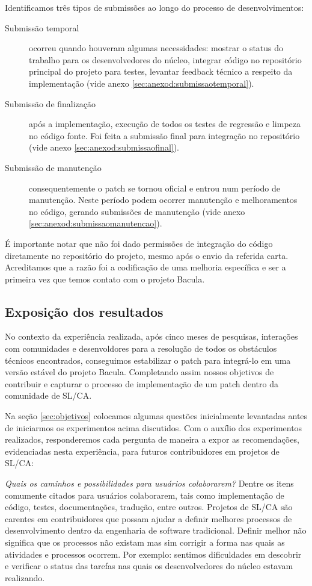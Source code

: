 Identificamos três tipos de submissões ao longo do processo de desenvolvimentos:

\begin{description}
\item[Submissão temporal] ocorreu quando houveram algumas necessidades: mostrar o status do trabalho para os desenvolvedores do núcleo, integrar código no repositório principal do projeto para testes, levantar feedback técnico a respeito da implementação (vide anexo \ref{sec:anexod:submissaotemporal}).
\item[Submissão de finalização] após a implementação, execução de todos os testes de regressão e limpeza no código fonte. Foi feita a submissão final para integração no repositório (vide anexo \ref{sec:anexod:submissaofinal}).
\item[Submissão de manutenção] consequentemente o patch \patchshort se tornou oficial e entrou num período de manutenção. Neste período podem ocorrer manutenção e melhoramentos no código, gerando submissões de manutenção (vide anexo \ref{sec:anexod:submissaomanutencao}).
\end{description}

É importante notar que não foi dado permissões de integração do código diretamente no repositório do projeto, mesmo após o envio da referida carta. Acreditamos que a razão foi a codificação de uma melhoria específica e ser a primeira vez que temos contato com o projeto Bacula.

\subsection{Exposição dos resultados}

No contexto da experiência realizada, após cinco meses de pesquisas, interações com  comunidades e desenvoldores para a resolução de todos os obstáculos técnicos encontrados, conseguimos estabilizar o patch \patchshort para integrá-lo em uma versão estável do projeto Bacula. Completando assim nossos objetivos de contribuir e capturar o processo de implementação de um patch dentro da comunidade de SL/CA. 

Na seção \ref{sec:objetivos} colocamos algumas questões inicialmente levantadas antes de iniciarmos os experimentos acima discutidos. Com o auxílio dos experimentos realizados, responderemos cada pergunta de maneira a expor as recomendações, evidenciadas nesta experiência, para futuros contribuidores em projetos de SL/CA:

\textit{Quais os caminhos e possibilidades para usuários colaborarem?} Dentre os itens comumente citados para usuários colaborarem, tais como implementação de código, testes, documentações, tradução, entre outros. Projetos de SL/CA são carentes em contribuidores que possam ajudar a definir melhores processos de desenvolvimento dentro da engenharia de software tradicional. Definir melhor não significa que os processos não existam mas sim corrigir a forma nas quais as atividades e processos ocorrem. Por exemplo: sentimos dificuldades em descobrir e verificar o status das tarefas nas quais os desenvolvedores do núcleo estavam realizando.

